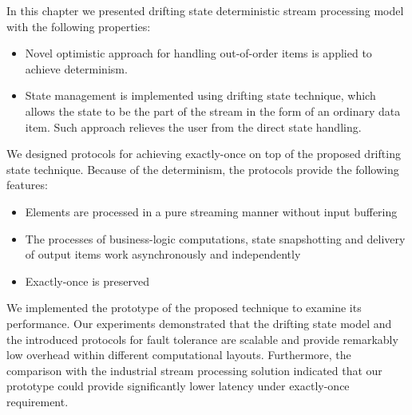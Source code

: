 In this chapter we presented drifting state deterministic stream processing model with the following properties:

\begin{itemize}
  \item Novel optimistic approach for handling out-of-order items is applied to achieve determinism.
  \item State management is implemented using drifting state technique, which allows the state to be the part of the stream in the form of an ordinary data item. Such approach relieves the user from the direct state handling.
\end{itemize}

We designed protocols for achieving exactly-once on top of the proposed drifting state technique. Because of the determinism, the protocols provide the following features:

\begin{itemize}
    \item Elements are processed in a pure streaming manner without input buffering
    \item The processes of business-logic computations, state snapshotting and delivery of output items work asynchronously and independently
    \item Exactly-once is preserved
\end{itemize}

We implemented the prototype of the proposed technique to examine its performance. Our experiments demonstrated that the drifting state model and the introduced protocols for fault tolerance are scalable and provide remarkably low overhead within different computational layouts. Furthermore, the comparison with the industrial stream processing solution indicated that our prototype could provide significantly lower latency under exactly-once requirement.

